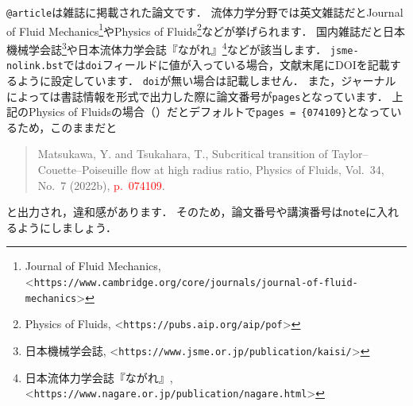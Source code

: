\documentclass[a4paper,fleqn,uplatex,dvipdfmx]{jsarticle}
\makeatletter
\newcommand{\jsmefile}{\texttt{jsme-nolink.bst}}
\newcommand{\ttarticle}{\texttt{@article}}
\makeatother
\begin{document}
\ttarticle は雑誌に掲載された論文です．
流体力学分野では英文雑誌だとJournal of Fluid Mechanics\footnote{Journal of Fluid Mechanics, \textless\verb|https://www.cambridge.org/core/journals/journal-of-fluid-mechanics|\textgreater}やPhysics of Fluids\footnote{Physics of Fluids, \textless\verb|https://pubs.aip.org/aip/pof|\textgreater}などが挙げられます．
国内雑誌だと日本機械学会誌\footnote{日本機械学会誌, \textless\verb|https://www.jsme.or.jp/publication/kaisi/|\textgreater}や日本流体力学会誌『ながれ』\footnote{日本流体力学会誌『ながれ』, \textless\verb|https://www.nagare.or.jp/publication/nagare.html|\textgreater}などが該当します．
\jsmefile では\verb|doi|フィールドに値が入っている場合，文献末尾にDOIを記載するように設定しています．
\verb|doi|が無い場合は記載しません．
また，ジャーナルによっては書誌情報を\BibTeX{}形式で出力した際に論文番号が\verb|pages|となっています．
上記のPhysics of Fluidsの場合（\citealp{Matsukawa:PoF2022}）だとデフォルトで\verb|pages = {074109}|となっているため，このままだと
\begin{quote}
    Matsukawa, Y. and Tsukahara, T., Subcritical transition of Taylor--Couette--Poiseuille flow at high radius ratio, Physics of Fluids, Vol.~34, No.~7 (2022b), \textcolor{red}{p.~074109}.
\end{quote}
と出力され，違和感があります．
そのため，論文番号や講演番号は\verb|note|に入れるようにしましょう．
\end{document}
